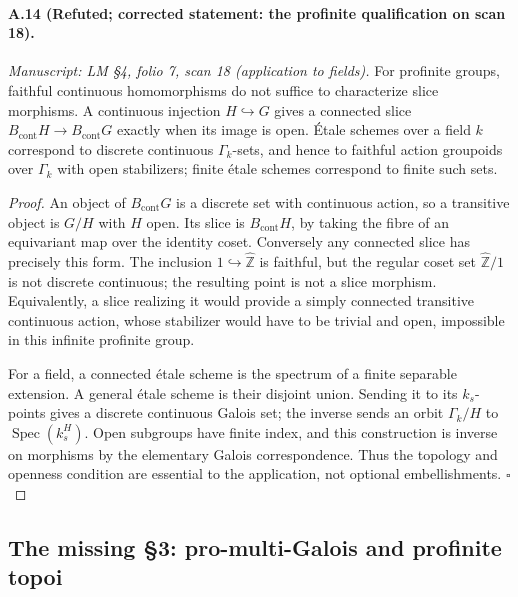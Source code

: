 \paragraph{A.14 (Refuted; corrected statement: the profinite qualification on scan 18).}
\textit{Manuscript: LM \S4, folio 7, scan 18 (application to fields).}
For profinite groups, faithful continuous homomorphisms do not suffice to characterize slice morphisms. A continuous injection $H\hookrightarrow G$ gives a connected slice $B_{\mathrm{cont}}H\to B_{\mathrm{cont}}G$ exactly when its image is open. Étale schemes over a field $k$ correspond to discrete continuous $\Gamma_k$-sets, and hence to faithful action groupoids over $\Gamma_k$ with open stabilizers; finite étale schemes correspond to finite such sets.
\begin{proof}
An object of $B_{\mathrm{cont}}G$ is a discrete set with continuous action, so a transitive object is $G/H$ with $H$ open. Its slice is $B_{\mathrm{cont}}H$, by taking the fibre of an equivariant map over the identity coset. Conversely any connected slice has precisely this form. The inclusion $1\hookrightarrow\widehat{\mathbb Z}$ is faithful, but the regular coset set $\widehat{\mathbb Z}/1$ is not discrete continuous; the resulting point is not a slice morphism. Equivalently, a slice realizing it would provide a simply connected transitive continuous action, whose stabilizer would have to be trivial and open, impossible in this infinite profinite group.

For a field, a connected étale scheme is the spectrum of a finite separable extension. A general étale scheme is their disjoint union. Sending it to its $k_s$-points gives a discrete continuous Galois set; the inverse sends an orbit $\Gamma_k/H$ to $\operatorname{Spec}(k_s^H)$. Open subgroups have finite index, and this construction is inverse on morphisms by the elementary Galois correspondence. Thus the topology and openness condition are essential to the application, not optional embellishments. \hfill$\square$
\end{proof}

\subsection{The missing \S3: pro-multi-Galois and profinite topoi}

